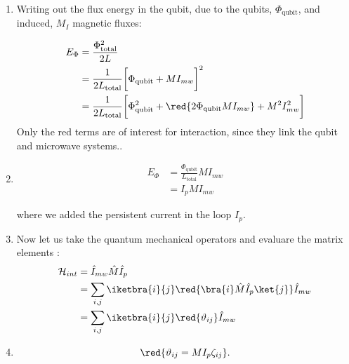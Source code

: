 \begin{minipage}{0.5\linewidth}%
  \begin{enumerate}%
  \item Writing  out the flux  energy in the  qubit, due to  the qubits,
    $ \Phi_\text{qubit} $, and induced, $ M_I $ magnetic fluxes:

    \begin{equation}\label{eq:couple8}
      \begin{aligned}
        E_\Phi &= \frac{\Phi_\text{total}^2}{2L}\\
        & = \frac{1}{2L_{\text{total}}}\bigg[\Phi_\text{qubit} + MI_{mw}\bigg]^2\\
        &    =   \frac{1}{2L_\text{total}}\bigg[\Phi_\text{qubit}^2    +
        \red{2\Phi_\text{qubit}MI_{mw}} + M^2I_{mw}^2\bigg]
      \end{aligned}
    \end{equation}
    \noindent Only the red terms  are of interest for interaction, since
    they link  the qubit  and microwave systems..

  \item \begin{equation}\label{eq:couple9}
      \begin{aligned}
        E_\Phi &= \frac{\Phi_\text{qubit}}{L_\text{total}}MI_{mw}\\
        & = I_pMI_{mw}
      \end{aligned}
    \end{equation}

    \noindent where we added the persistent current in the loop $ I_p $.

  \item Now  let us take  the quantum mechanical operators  and evaluare
    the matrix elements \cite{Astafiev2010}:
    \begin{equation}\label{eqn:dipole_1}
      \begin{aligned}
        \mathcal{H}_{int} & = \hat{I}_{mw}\hat{M}\hat{I}_p\\
        & = \sum_{i,j}\iketbra{i}{j}\red{\bra{i}\hat{M}\hat{I}_p\ket{j}} \hat{I}_{mw}\\
        & = \sum_{i,j}\iketbra{i}{j}\red{\vartheta_{ij}} \hat{I}_{mw}\\
      \end{aligned}
    \end{equation}

  \item   \begin{equation}\label{eq:couple10}    \red{\vartheta_{ij}   =
        MI_p\zeta_{ij}}.
    \end{equation}


\end{enumerate}
\end{minipage}
